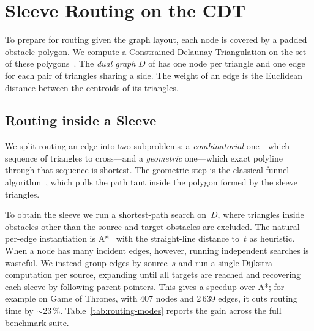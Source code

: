 \section{Sleeve Routing on the CDT}
\label{sec:sleeve-routing}

To prepare for routing given the graph layout, each node is covered by
a padded obstacle polygon. We compute a Constrained Delaunay
Triangulation \cdt{} on the set of these
polygons~\cite{delaunay1934sphere,domiter2008sweep}. The \emph{dual
graph} $D$ of \cdt{} has one node per triangle and one edge for each
pair of triangles sharing a side. The weight of an edge is the
Euclidean distance between the centroids of its triangles.

\subsection{Routing inside a Sleeve}
\label{sec:sleeve}

We split routing an edge into two subproblems: a \emph{combinatorial}
one---which sequence of triangles to cross---and a \emph{geometric}
one---which exact polyline through that sequence is shortest. The
geometric step is the classical funnel
algorithm~\cite{chazelle1982theorem,hershberger1994computing}, which
pulls the path taut inside the polygon formed by the sleeve triangles.

To obtain the sleeve we run a shortest-path search on~$D$, where
triangles inside obstacles other than the source and target obstacles
are excluded. The natural per-edge instantiation is
A*~\cite{hart1968formal} with the straight-line distance to~$t$ as
heuristic. When a node has many incident edges, however, running
independent searches is wasteful. We instead group edges by source~$s$
and run a single Dijkstra computation per source, expanding until all
targets are reached and recovering each sleeve by following parent
pointers. This gives a speedup over A*; for example on Game of Thrones,
with 407 nodes and 2\,639 edges, it cuts routing time by $\sim$23\,\%.
Table~\ref{tab:routing-modes} reports the gain across the full
benchmark suite.

